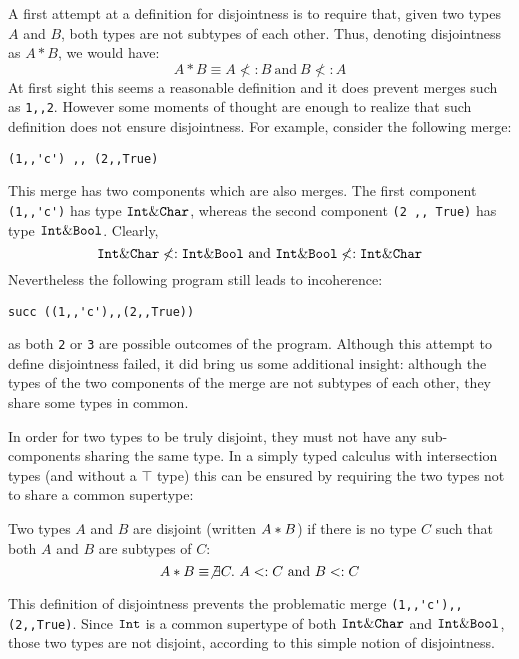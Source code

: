 A first attempt at a definition for disjointness is to require that,
given two types $A$ and $B$, both types are not subtypes of each
other. Thus, denoting disjointness as $A * B$, we would have:
\[A * B \equiv A \not<: B~\text{and}~B \not<: A\]
At first sight this seems a reasonable definition and it does prevent
merges such as \lstinline{1,,2}. However some moments of thought are enough to realize that
such definition does not ensure disjointness. For example, consider
the following merge:

\begin{lstlisting}
(1,,'c') ,, (2,,True)
\end{lstlisting}

\noindent This merge has two components which are also merges. 
The first component \lstinline{(1,,'c')} has type $\texttt{Int} \&
\texttt{Char}$, whereas the second component \lstinline{(2 ,, True)} has type
$\texttt{Int} \& \texttt{Bool}$. Clearly,
\[ \texttt{Int} \& \texttt{Char} \not <: \texttt{Int} \& \texttt{Bool}~\text{and}~\texttt{Int} \& \texttt{Bool} \not <: \texttt{Int} \& \texttt{Char} \]
Nevertheless the following program still leads to
incoherence:
\begin{lstlisting}
succ ((1,,'c'),,(2,,True))
\end{lstlisting}
as both \lstinline{2} or \lstinline{3} are possible outcomes
of the program. Although this attempt to define disjointness failed,
it did bring us some additional insight: although the types of the two
components of the merge are not subtypes of each other, they share
some types in common.

In order for two types to be truly disjoint, they must not have any
sub-components sharing the same type. In a simply typed calculus with intersection
types (and without a $\top$ type) this can be ensured by requiring the two types 
not to share a common supertype: 

\begin{definition}
  Two types $A$ and $B$ are disjoint
  (written $A * B$) if there is no type $C$ such that both $A$ and $B$ are
  subtypes of $C$:
  \[A * B \equiv \not\exists C.~A <: C~\text{and}~B<: C\]
\end{definition}\label{def:simple_dis}

\noindent This definition of disjointness prevents the problematic merge
\lstinline$(1,,'c'),,(2,,True)$. Since $\texttt{Int}$ is a
common supertype of both $\texttt{Int} \& \texttt{Char}$ and $\texttt{Int}
\& \texttt{Bool}$, those two types are not disjoint, according to this
simple notion of disjointness.

